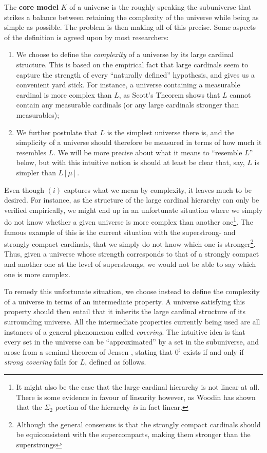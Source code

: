 \documentclass[../../main]{subfiles}
\begin{document}
\qquad The \textbf{core model} $K$ of a universe is the roughly speaking the subuniverse that strikes a balance between retaining the complexity of the universe while being as simple as possible. The problem is then making all of this precise. Some aspects of the definition is agreed upon by most researchers:
\begin{enumerate}
  \item We choose to define the \textit{complexity} of a universe by its large cardinal structure. This is based on the empirical fact that large cardinals seem to capture the strength of every ``naturally defined'' hypothesis, and gives us a convenient yard stick. For instance, a universe containing a measurable cardinal is more complex than $L$, as Scott's Theorem  shows that $L$ cannot contain any measurable cardinals (or any large cardinals stronger than measurables);
  \item We further postulate that $L$ is the simplest universe there is, and the simplicity of a universe should therefore be measured in terms of how much it resembles $L$. We will be more precise about what it means to ``resemble $L$'' below, but with this intuitive notion is should at least be clear that, say, $L$ is simpler than $L[\mu]$.\\
\end{enumerate}

Even though $(i)$ captures what we mean by complexity, it leaves much to be desired. For instance, as the structure of the large cardinal hierarchy can only be verified empirically, we might end up in an unfortunate situation where we simply do not know whether a given universe is more complex than another one\footnote{It might also be the case that the large cardinal hierarchy is not linear at all. There is some evidence in favour of linearity however, as Woodin  has shown that the $\Sigma_2$ portion of the hierarchy \textit{is} in fact linear.}. The famous example of this is the current situation with the superstrong- and strongly compact cardinals, that we simply do not know which one is stronger\footnote{Although the general consensus is that the strongly compact cardinals should be equiconsistent with the supercompacts, making them stronger than the superstrongs}. Thus, given a universe whose strength corresponds to that of a strongly compact and another one at the level of superstrongs, we would not be able to say which one is more complex. 

\qquad To remedy this unfortunate situation, we choose instead to define the complexity of a universe in terms of an intermediate property. A universe satisfying this property should then entail that it inherits the large cardinal structure of its surrounding universe. All the intermediate properties currently being used are all instances of a general phenomenon called \textit{covering}. The intuitive idea is that every set in the universe can be ``approximated'' by a set in the subuniverse, and arose from a seminal theorem of Jensen , stating that $0^\sharp$ exists if and only if \textit{strong covering} fails for $L$, defined as follows.
\end{document}
